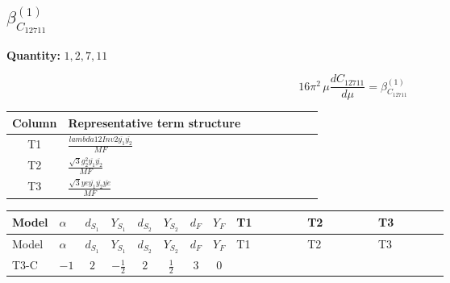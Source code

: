 \documentclass[8pt]{article}
\begin{document}
\begin{landscape}
\section*{$\beta_{C_{12711}}^{(1)}$}
\noindent\textbf{Quantity: }$\mathrm{1,2,7,11}$\par\smallskip
\[16\pi^2\,\mu\frac{d C_{12711}}{d\mu}=\beta_{C_{12711}}^{(1)}\]
\begin{center}
\begin{tabular}{@{}c >{\raggedright\arraybackslash}p{0.82\linewidth}@{}}
\toprule
Column & Representative term structure \\
\midrule
T1 & \(\displaystyle \frac{lambda12Inv2 \overline{y_{1}} \overline{y_{2}}}{MF}\) \\
\midrule
T2 & \(\displaystyle \frac{\sqrt{3} g_{2}^{2} \overline{y_{1}} \overline{y_{2}}}{MF}\) \\
\midrule
T3 & \(\displaystyle \frac{\sqrt{3} ye \overline{y_{1}} \overline{y_{2}} \overline{ye}}{MF}\) \\
\midrule
\bottomrule
\end{tabular}
\end{center}
\smallskip
\tiny
\begin{longtable}{@{}llcccccc >{\raggedright\arraybackslash}p{0.21\linewidth} >{\raggedright\arraybackslash}p{0.21\linewidth} >{\raggedright\arraybackslash}p{0.21\linewidth}@{}}
\toprule
Model & $\alpha$ & $d_{S_1}$ & $Y_{S_1}$ & $d_{S_2}$ & $Y_{S_2}$ & $d_F$ & $Y_F$ & T1 & T2 & T3 \\
\midrule
\endfirsthead
\toprule
Model & $\alpha$ & $d_{S_1}$ & $Y_{S_1}$ & $d_{S_2}$ & $Y_{S_2}$ & $d_F$ & $Y_F$ & T1 & T2 & T3 \\
\midrule
\endhead
T3-C & $-1$ & $2$ & $-\frac{1}{2}$ & $2$ & $\frac{1}{2}$ & $3$ & $0$ & \scriptsize\adjustbox{max width=\linewidth}{$\begin{gathered} \frac{lambda12Inv2 \overline{y_{1}} \overline{y_{2}}}{6 MF}\end{gathered}$} & \scriptsize\adjustbox{max width=\linewidth}{$\begin{gathered} \frac{\sqrt{3} g_{2}^{2} \overline{y_{1}} \overline{y_{2}}}{8 MF}\end{gathered}$} & \scriptsize\adjustbox{max width=\linewidth}{$\begin{gathered} - \frac{\sqrt{3} ye \overline{y_{1}} \overline{y_{2}} \overline{ye}}{24 MF}\end{gathered}$} \\
\midrule
\bottomrule
\end{longtable}
\clearpage

\end{landscape}
\end{document}
